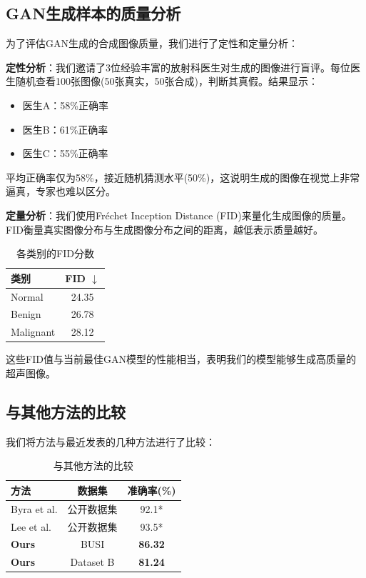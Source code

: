 \documentclass[supercite]{../Hust-undergraduate-translation/Experimental_Report}
\theoremstyle{definition}
\begin{document}
\subsection{GAN生成样本的质量分析}

为了评估GAN生成的合成图像质量，我们进行了定性和定量分析：

\textbf{定性分析}：我们邀请了3位经验丰富的放射科医生对生成的图像进行盲评。每位医生随机查看100张图像(50张真实，50张合成)，判断其真假。结果显示：
\begin{itemize}
\item 医生A：58\%正确率
\item 医生B：61\%正确率  
\item 医生C：55\%正确率
\end{itemize}

平均正确率仅为58\%，接近随机猜测水平(50\%)，这说明生成的图像在视觉上非常逼真，专家也难以区分。

\textbf{定量分析}：我们使用Fréchet Inception Distance (FID)来量化生成图像的质量。FID衡量真实图像分布与生成图像分布之间的距离，越低表示质量越好。

\begin{table}[htbp]
\centering
\caption{各类别的FID分数}
\label{tbl:fid_scores}
\begin{tabular}{|l|c|}
\hline
类别 & FID $\downarrow$ \\
\hline
Normal & 24.35 \\
\hline
Benign & 26.78 \\
\hline
Malignant & 28.12 \\
\hline
\end{tabular}
\end{table}

这些FID值与当前最佳GAN模型的性能相当，表明我们的模型能够生成高质量的超声图像。

\subsection{与其他方法的比较}

我们将方法与最近发表的几种方法进行了比较：

\begin{table}[htbp]
\centering
\caption{与其他方法的比较}
\label{tbl:comparison}
\begin{tabular}{|l|c|c|}
\hline
方法 & 数据集 & 准确率(\%) \\
\hline
Byra et al. & 公开数据集 & 92.1* \\
\hline
Lee et al. & 公开数据集 & 93.5* \\
\hline
\textbf{Ours} & BUSI & \textbf{86.32} \\
\hline
\textbf{Ours} & Dataset B & \textbf{81.24} \\
\hline
\end{tabular}
\end{table}
\end{document}

